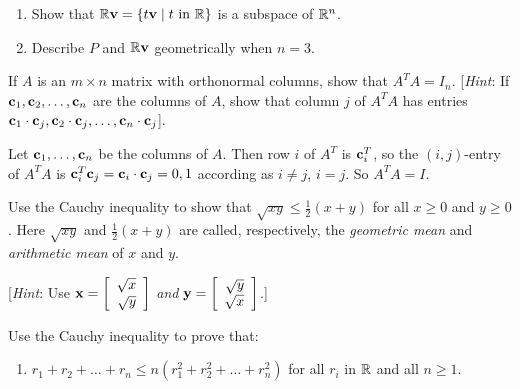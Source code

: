 \begin{multicols}{2}
\begin{ex}
\begin{enumerate}[label={\alph*.}]
\item Show that $\mathbb{R}\textbf{v} = \{t\textbf{v} \mid t  \mbox{ in }\mathbb{R}\}$ is a subspace of $\mathbb{R}^n$.

\item Describe $P$ and $\mathbb{R}\textbf{v}$ geometrically when $n = 3$.

\end{enumerate}
\end{ex}

\begin{ex}\label{ex:5.3.9}
If $A$ is an $m \times n$ matrix with orthonormal columns, show that $A^{T}A = I_{n}$. [\textit{Hint}: If $\textbf{c}_{1}, \textbf{c}_{2}, \dots, \textbf{c}_{n}$ are the columns of $A$, show that column $j$ of $A^{T}A$ has entries $\textbf{c}_{1} \cdot \textbf{c}_{j}, \textbf{c}_{2} \cdot \textbf{c}_{j}, \dots, \textbf{c}_{n} \cdot \textbf{c}_{j}$].

\begin{sol}
Let $\textbf{c}_{1}, \dots, \textbf{c}_{n}$ be the columns of $A$. Then row $i$ of $A^{T}$ is $\textbf{c}_{i}^{T}$, so the $(i, j)$-entry of $A^{T}A$ is $\textbf{c}_{i}^{T}\textbf{c}_j = \textbf{c}_{i} \cdot \textbf{c}_{j} = 0, 1$ according as $i \neq j$, $i = j$. So $A^{T}A = I$.
\end{sol}
\end{ex}

\begin{ex}
Use the Cauchy inequality to show that $\sqrt{xy} \leq \frac{1}{2}(x + y)$ for all $x \geq 0$ and $y \geq 0$. Here  $\sqrt{xy}$ and $\frac{1}{2}(x + y)$ are called, respectively, the \textit{geometric mean} and \textit{arithmetic mean} of $x$ and $y$.

[\textit{Hint}: Use 
$ \textbf{x} = 
\left[ \begin{array}{r}
\sqrt{x} \\
\sqrt{y}
\end{array} \right]
$
 \textit{and} 
$
\textbf{y} = 
\left[ \begin{array}{r}
\sqrt{y} \\
\sqrt{x}
\end{array} \right]
$.]
\end{ex}

\begin{ex}
Use the Cauchy inequality to prove that:

\begin{enumerate}[label={\alph*.}]
\item  $r_1 + r_2 + \dots + r_n \leq n(r_1^2 + r_2^2 + \dots + r_n^2)$ for all $ r_i $ in $\mathbb{R}$ and all $n \geq 1$.


\end{enumerate}
\end{ex}
\end{multicols}
